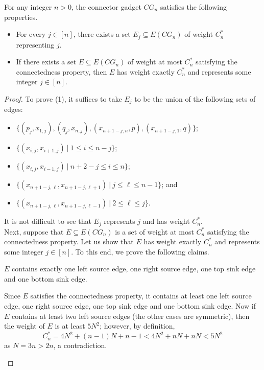\begin{lemma}
\label{lem:cg}
For any integer $n > 0$, the connector gadget $CG_n$ satisfies the following properties.
\begin{itemize}
\item[(1)] For every $j \in [n]$, there exists a set $E_j \subseteq E(CG_n)$ of weight $C_n^*$ representing $j$.
\item[(2)] If there exists a set $E \subseteq E(CG_n)$ of weight at most $C_n^*$ satisfying the connectedness property, then $E$ has weight exactly $C_n^*$ and represents some integer $j \in [n]$.
\end{itemize}
\end{lemma}

\begin{proof}
To prove (1), it suffices to take $E_j$ to be the union of the following sets of edges:
\begin{itemize}
\item $\{(p_j,x_{1,j}),(q_j,x_{n,j}),(x_{n+1-j,n},p),(x_{n+1-j,1},q)\}$; 
\item $\{(x_{i,j},x_{i+1,j})~|~1 \leq i \leq n-j\}$; 
\item $\{(x_{i,j},x_{i-1,j})~|~n+2-j \leq i \leq n\}$; 
\item $\{(x_{n+1-j,\ell}, x_{n+1-j,\ell+1})~|~j \leq \ell \leq n-1\}$; and
\item $\{(x_{n+1-j,\ell},x_{n+1-j,\ell -1})~|~2 \leq \ell \leq j\}$.
\end{itemize}
It is not difficult to see that $E_j$ represents $j$ and has weight $C_n^*$.\\

Next, suppose that $E \subseteq E(CG_n)$ is a set of weight at most $C_n^*$ satisfying the connectedness property. Let us show that $E$ has weight exactly $C_n^*$ and represents some integer $j \in [n]$. To this end, we prove the following claims.

\begin{claim}
\label{clm:sourcesinkedges}
$E$ contains exactly one left source edge, one right source edge, one top sink edge and one bottom sink edge.
\end{claim}

\begin{claimproof}
Since $E$ satisfies the connectedness property, it contains at least one left source edge, one right source edge, one top sink edge and one bottom sink edge. Now if $E$ contains at least two left source edges (the other cases are symmetric), then the weight of $E$ is at least $5N^2$; however, by definition,
\[
C_n^*  = 4N^2 + (n-1)N+ n-1 < 4N^2 + nN + nN < 5N^2
\]
as $N = 3n > 2n$, a contradiction.
\end{claimproof}


\end{proof}

